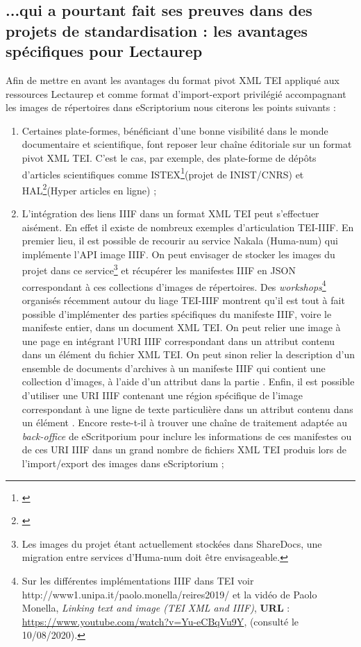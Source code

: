 \subsection{...qui a pourtant fait ses preuves dans des projets de standardisation : les avantages spécifiques pour Lectaurep}\label{positif_TEI}
Afin de mettre en avant les avantages du format pivot XML TEI appliqué aux ressources Lectaurep et comme format d'import-export privilégié accompagnant les images de répertoires dans eScriptorium nous citerons les points suivants :\\
\begin{enumerate}
    \item Certaines plate-formes, bénéficiant d'une bonne visibilité dans le monde documentaire et scientifique, font reposer leur chaîne éditoriale sur un format pivot XML TEI. C'est le cas, par exemple, des plate-forme de dépôts d'articles scientifiques comme ISTEX\footnote{\cite{inistcnrs_istex_2020}}(projet de INIST/CNRS) et HAL\footnote{\cite{capelli_tei_2015}}(Hyper articles en ligne) ;\\
    \item L'intégration des liens IIIF dans un format XML TEI peut s'effectuer aisément. En effet il existe de nombreux exemples d'articulation TEI-IIIF. En premier lieu, il est possible de recourir au service Nakala (Huma-num) qui implémente l'API image IIIF. On peut envisager de stocker les images du projet dans ce service\footnote{Les images du projet étant actuellement stockées dans ShareDocs, une migration entre services d'Huma-num doit être envisageable.} et récupérer les manifestes IIIF en JSON correspondant à ces collections d'images de répertoires. Des \textit{workshops}\footnote{Sur les différentes implémentations IIIF dans TEI voir http://www1.unipa.it/paolo.monella/reires2019/ et la vidéo de Paolo Monella, \textit{Linking text and image (TEI XML and IIIF)}, \textbf{URL} : \url{https://www.youtube.com/watch?v=Yu-eCBqVu9Y}, (consulté le 10/08/2020).} organisés récemment autour du liage TEI-IIIF montrent qu'il est tout à fait possible d'implémenter des parties spécifiques du manifeste IIIF, voire le manifeste entier, dans un document XML TEI. On peut relier une image à une page en intégrant l'URI IIIF correspondant dans un attribut  contenu dans un élément  du fichier XML TEI. On peut sinon relier la description d'un ensemble de documents d'archives à un manifeste IIIF qui contient une collection d'images, à l'aide d'un attribut  dans la partie . Enfin, il est possible d'utiliser une URI IIIF contenant une région spécifique de l'image correspondant à une ligne de texte particulière dans un attribut  contenu dans un élément . Encore reste-t-il à trouver une chaîne de traitement adaptée au \textit{back-office} de eScritporium pour inclure les informations de ces manifestes ou de ces URI IIIF dans un grand nombre de fichiers XML TEI produis lors de l'import/export des images dans eScriptorium ;\\

\end{enumerate}
